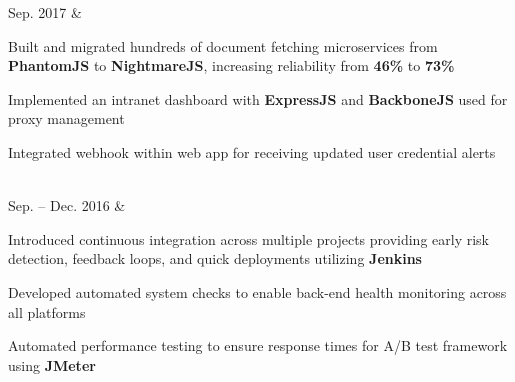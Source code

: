 \documentclass[]{richard-dang}
\begin{document}
\begin{tabularcv}
    Sep. 2017   &  
                    \href{http://hubdoc.com}{
                    }
                    \begin{tabitemize}
                        \item Built and migrated hundreds of document fetching microservices from \textbf{PhantomJS} to \textbf{NightmareJS}, increasing reliability from \textbf{46\%} to \textbf{73\%}
                        \item Implemented an intranet dashboard with \textbf{ExpressJS} and \textbf{BackboneJS} used for proxy management
                        \item Integrated webhook within web app for receiving updated user credential alerts 
                    \end{tabitemize} 
                    \\[\vspacepar] 
    Sep. – \newline 
    Dec. 2016   &   
                    \href{http://flipp.com}{
                    }
                    \begin{tabitemize}
                        \item Introduced continuous integration across multiple projects providing early risk detection, feedback loops, and quick deployments utilizing \textbf{Jenkins}
                        \item Developed automated system checks to enable back-end health monitoring across all platforms
                        \item Automated performance testing to ensure response times for A/B test framework using \textbf{JMeter}
                    \end{tabitemize} 
                    \\[\vspacepar] 
\end{tabularcv}   
\end{document}
